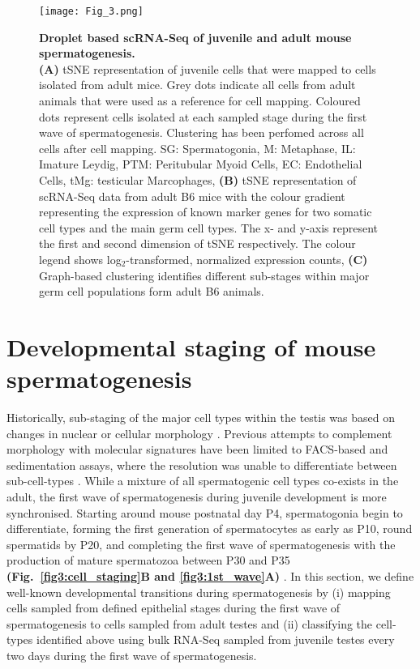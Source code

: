 \newpage

\begin{figure}[!h]
\centering
\texttt{[image: Fig\_3.png]}
\caption[Droplet based scRNA-Seq of juvenile and adult mouse spermatogenesis]{\textbf{Droplet based scRNA-Seq of juvenile and adult mouse spermatogenesis.}\\
\textbf{(A)} tSNE representation of juvenile cells that were mapped to cells isolated from adult mice. Grey dots indicate all cells from adult animals that were used as a reference for cell mapping. Coloured dots represent cells isolated at each sampled stage during the first wave of spermatogenesis. Clustering has been perfomed across all cells after cell mapping. SG: Spermatogonia, M: Metaphase, IL: Imature Leydig, PTM: Peritubular Myoid Cells, EC: Endothelial Cells, tMg: testicular Marcophages, \textbf{(B)} tSNE representation of scRNA-Seq data from adult B6 mice with the colour gradient representing the expression of known marker genes for two somatic cell types and the main germ cell types. The x- and y-axis represent the first and second dimension of tSNE respectively. The colour legend shows log$_2$-transformed, normalized expression counts, \textbf{(C)} Graph-based clustering identifies different sub-stages within major germ cell populations form adult B6 animals. 
}
\label{fig3:cell_types}
\end{figure}

\newpage

\section{Developmental staging of mouse spermatogenesis}

Historically, sub-staging of the major cell types within the testis was based on changes in nuclear or cellular morphology \citep{Oakberg1956,  Oakberg1956a}. Previous attempts to complement morphology with molecular signatures have been limited to FACS-based and sedimentation assays, where the resolution was unable to differentiate between sub-cell-types \citep{Bastos2005, Gaysinskaya2014, Lam1970, Meistrich1977, Romrell1976, Soumillon2013}. While a mixture of all spermatogenic cell types co-exists in the adult, the first wave of spermatogenesis during juvenile development is more synchronised. Starting around mouse postnatal day P4, spermatogonia begin to differentiate, forming the first generation of spermatocytes as early as P10, round spermatids by P20, and completing the first wave of spermatogenesis with the production of mature spermatozoa between P30 and P35 \textbf{(Fig.~\ref{fig3:cell_staging}B and \ref{fig3:1st_wave}A)} \citep{Bellve1977, Janca1986, Nebel1961}. In this section, we define well-known developmental transitions during spermatogenesis by (i) mapping cells sampled from defined epithelial stages during the first wave of spermatogenesis to cells sampled from adult testes and (ii) classifying the cell-types identified above using bulk RNA-Seq sampled from juvenile testes every two days during the first wave of spermatogenesis. 

